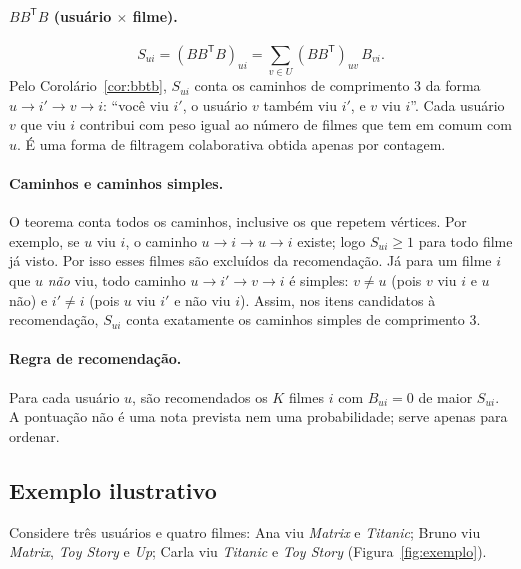 \documentclass[12pt,a4paper]{article}
\theoremstyle{definition}
\begin{document}
\paragraph{$BB^{\mathsf T}B$ (usuário $\times$ filme).}
\[
  S_{ui} = (BB^{\mathsf T}B)_{ui} = \sum_{v \in U} (BB^{\mathsf T})_{uv}\, B_{vi}.
\]
Pelo Corolário~\ref{cor:bbtb}, $S_{ui}$ conta os caminhos de comprimento 3 da forma
$u \to i' \to v \to i$: ``você viu $i'$, o usuário $v$ também viu $i'$, e $v$
viu $i$''. Cada usuário $v$ que viu $i$ contribui com peso igual ao número de
filmes que tem em comum com $u$. É uma forma de filtragem colaborativa obtida
apenas por contagem.


\paragraph{Caminhos e caminhos simples.}
O teorema conta todos os caminhos, inclusive os que repetem vértices. Por
exemplo, se $u$ viu $i$, o caminho $u \to i \to u \to i$ existe; logo
$S_{ui} \geq 1$ para todo filme já visto. Por isso esses filmes são excluídos
da recomendação. Já para um filme $i$ que $u$ \emph{não} viu, todo caminho
$u \to i' \to v \to i$ é simples: $v \neq u$ (pois $v$ viu $i$ e $u$ não) e
$i' \neq i$ (pois $u$ viu $i'$ e não viu $i$). Assim, nos itens candidatos à
recomendação, $S_{ui}$ conta exatamente os caminhos simples de comprimento 3.

\paragraph{Regra de recomendação.}
Para cada usuário $u$, são recomendados os $K$ filmes $i$ com $B_{ui} = 0$ de maior
$S_{ui}$. A pontuação não é uma nota prevista nem uma probabilidade; serve
apenas para ordenar.

\subsection{Exemplo ilustrativo}\label{sec:exemplo}

Considere três usuários e quatro filmes: Ana viu \emph{Matrix} e
\emph{Titanic}; Bruno viu \emph{Matrix}, \emph{Toy Story} e \emph{Up}; Carla
viu \emph{Titanic} e \emph{Toy Story} (Figura~\ref{fig:exemplo}).
\end{document}
